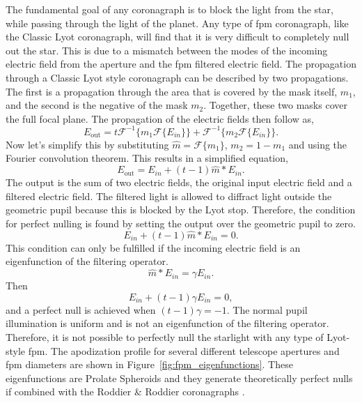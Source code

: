 \documentclass[letterpaper]{ar-1col}
\newcommand{\fourier}[1]{\mathcal{F}\{#1\}}
\newcommand{\invfourier}[1]{\mathcal{F}^{-1}\{#1\}}
\begin{document}
The fundamental goal of any coronagraph is to block the light from the star, while passing through the light of the planet. Any type of \ac{fpm} coronagraph, like the Classic Lyot coronagraph, will find that it is very difficult to completely null out the star. This is due to a mismatch between the modes of the incoming electric field from the aperture and the \ac{fpm} filtered electric field.
%
The propagation through a Classic Lyot style coronagraph can be described by two propagations.
%
The first is a propagation through the area that is covered by the mask itself, $m_1$, and the second is the negative of the mask $m_2$.
%
Together, these two masks cover the full focal plane.
%
The propagation of the electric fields then follow as,
\begin{equation}
    E_{\mathrm{out}} = t\invfourier{m_1 \fourier{E_{in}}} + \invfourier{m_2 \fourier{E_{in}}}.
\end{equation}
Now let's simplify this by substituting $\hat{m}=\fourier{m_1}$, $m_2 = 1 - m_1$ and using the Fourier convolution theorem. This results in a simplified equation,
\begin{equation}
    E_{\mathrm{out}} = E_{in} + (t-1)\hat{m}*E_{in}.
\end{equation}
The output is the sum of two electric fields, the original input electric field and a filtered electric field.
%
The filtered light is allowed to diffract light outside the geometric pupil because this is blocked by the Lyot stop.
%
Therefore, the condition for perfect nulling is found by setting the output over the geometric pupil to zero. 
\begin{equation}
    E_{in} + (t-1)\hat{m}*E_{in} = 0.
\end{equation}
This condition can only be fulfilled if the incoming electric field is an eigenfunction of the filtering operator.
\begin{equation}
    \hat{m}*E_{in} = \gamma E_{in}.
\end{equation}
Then
\begin{equation}
    E_{in} + (t-1)\gamma E_{in} = 0,
\end{equation}
and a perfect null is achieved when $(t-1)\gamma = -1$.
%
The normal pupil illumination is uniform and is not an eigenfunction of the filtering operator.
%
Therefore, it is not possible to perfectly null the starlight with any type of Lyot-style \ac{fpm}.
%
The apodization profile for several different telescope apertures and \ac{fpm} diameters are shown in Figure~\ref{fig:fpm_eigenfunctions}.
%
These eigenfunctions are Prolate Spheroids and they generate theoretically perfect nulls if combined with the Roddier \& Roddier coronagraphs \citep{soummer2003stellar}.
\end{document}

